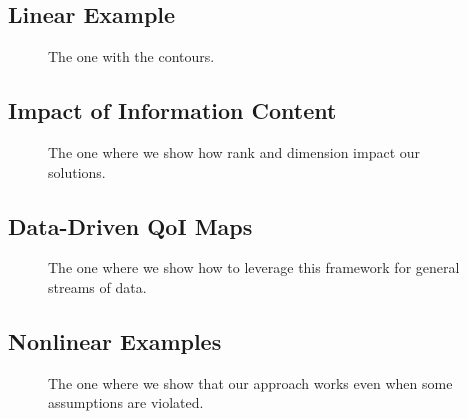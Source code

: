 \subsection{Linear Example}

\begin{frame}[t]
\centering
\begin{figure}
\centering

The one with the contours.

\end{figure}

\end{frame}

\subsection{Impact of Information Content}

\begin{frame}[t]
\centering
\begin{figure}
\centering

The one where we show how rank and dimension impact our solutions.

\end{figure}

\end{frame}


\subsection{Data-Driven QoI Maps}

\begin{frame}[t]
\centering
\begin{figure}
\centering

The one where we show how to leverage this framework for general streams of data.

\end{figure}

\end{frame}


\subsection{Nonlinear Examples}

\begin{frame}[t]
\centering
\begin{figure}
\centering

The one where we show that our approach works even when some assumptions are violated.

\end{figure}

\end{frame}

